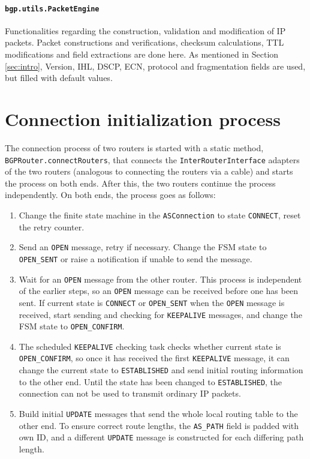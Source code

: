 \documentclass[11pt,a4paper,titlepage]{report}
\begin{document}
\paragraph{\texttt{bgp.utils.PacketEngine}}
Functionalities regarding the construction, validation and modification of IP packets. Packet constructions and verifications, checksum calculations, TTL modifications and field extractions are done here. As mentioned in Section \ref{sec:intro}, Version, IHL, DSCP, ECN, protocol and fragmentation fields are used, but filled with default values.


\section{Connection initialization process}\label{sec:init}
The connection process of two routers is started with a static method, \texttt{BGPRouter.connectRouters}, that connects the \texttt{InterRouterInterface} adapters of the two routers (analogous to connecting the routers via a cable) and starts the process on both ends. After this, the two routers continue the process independently. On both ends, the process goes as follows:
\begin{enumerate}
\item Change the finite state machine in the \texttt{ASConnection} to state \texttt{CONNECT}, reset the retry counter.
\item Send an \texttt{OPEN} message, retry if necessary. Change the FSM state to \texttt{OPEN\_SENT} or raise a notification if unable to send the message.
\item Wait for an \texttt{OPEN} message from the other router. This process is independent of the earlier steps, so an \texttt{OPEN} message can be received before one has been sent. If current state is \texttt{CONNECT} or \texttt{OPEN\_SENT} when the \texttt{OPEN} message is received, start sending and checking for \texttt{KEEPALIVE} messages, and change the FSM state to \texttt{OPEN\_CONFIRM}.
\item The scheduled \texttt{KEEPALIVE} checking task checks whether current state is \texttt{OPEN\_CONFIRM}, so once it has received the first \texttt{KEEPALIVE} message, it can change the current state to \texttt{ESTABLISHED} and send initial routing information to the other end. Until the state has been changed to \texttt{ESTABLISHED}, the connection can not be used to transmit ordinary IP packets.
\item Build initial \texttt{UPDATE} messages that send the whole local routing table to the other end. To ensure correct route lengths, the \texttt{AS\_PATH} field is padded with own ID, and a different \texttt{UPDATE} message is constructed for each differing path length.
\end{enumerate}
\end{document}
